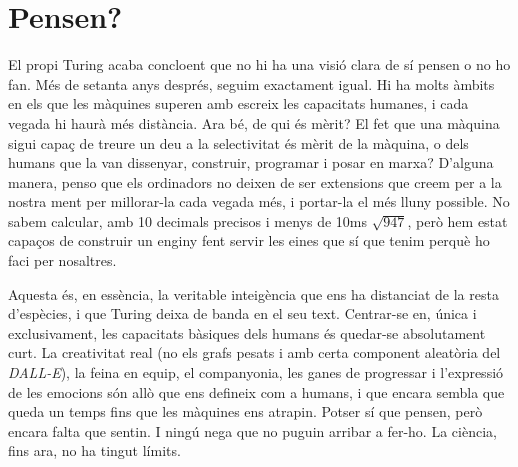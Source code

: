 \documentclass[a4paper, 11pt]{article}
\begin{document}
\section*{Pensen?}

El propi Turing acaba concloent que no hi ha una visió clara de sí pensen o no ho fan. Més de setanta anys després,
seguim exactament igual. Hi ha molts àmbits en els que les màquines superen amb escreix les capacitats humanes, i cada
vegada hi haurà més distància. Ara bé, de qui és mèrit? El fet que una màquina sigui capaç de treure un deu a la
selectivitat és mèrit de la màquina, o dels humans que la van dissenyar, construir, programar i posar en marxa?
D'alguna manera, penso que els ordinadors no deixen de ser extensions que creem per a la nostra ment per millorar-la
cada vegada més, i portar-la el més lluny possible. No sabem calcular, amb 10 decimals precisos i menys de 10ms
$\sqrt{947}$, però hem estat capaços de construir un enginy fent servir les eines que sí que tenim perquè ho faci per
nosaltres.

Aquesta és, en essència, la veritable inte\lgem{}igència que ens ha distanciat de la resta d'espècies, i que Turing
deixa de banda en el seu text. Centrar-se en, única i exclusivament, les capacitats bàsiques dels humans és quedar-se
absolutament curt. La creativitat real (no els grafs pesats i amb certa component aleatòria del \textit{DALL-E}), la
feina en equip, el companyonia, les ganes de progressar i l'expressió de les emocions són allò que ens defineix com a
humans, i que encara sembla que queda un temps fins que les màquines ens atrapin. Potser sí que pensen, però encara
falta que sentin. I ningú nega que no puguin arribar a fer-ho. La ciència, fins ara, no ha tingut límits.

\printbibliography{}
\end{document}
